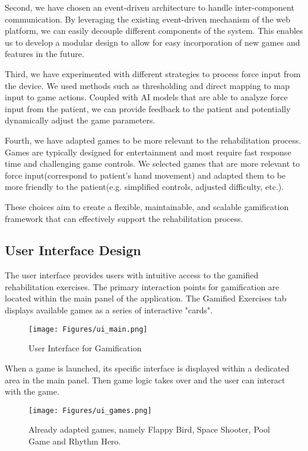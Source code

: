 Second, we have chosen an event-driven architecture to handle inter-component communication.
By leveraging the existing event-driven mechanism of the web platform, we can easily decouple different components of the system.
This enables us to develop a modular design to allow for easy incorporation of new games and features in the future.

Third, we have experimented with different strategies to process force input from the device.
We used methods such as thresholding and direct mapping to map input to game actions.
Coupled with AI models that are able to analyze force input from the patient, 
we can provide feedback to the patient and potentially dynamically adjust the game parameters.

Fourth, we have adapted games to be more relevant to the rehabilitation process. 
Games are typically designed for entertainment and most require fast response time and challenging game controls. 
We selected games that are more relevant to force input(correspond to patient's hand movement) 
and adapted them to be more friendly to the patient(e.g. simplified controls, adjusted difficulty, etc.).

These choices aim to create a flexible, maintainable, and scalable gamification framework that can effectively support the rehabilitation process.


\subsection{User Interface Design}
The user interface provides users with intuitive access to the gamified rehabilitation exercises. 
The primary interaction points for gamification are located within the main panel of the application. 
The Gamified Exercises tab displays available games as a series of interactive "cards". 
\begin{figure} [h!]
    \centering
    \texttt{[image: Figures/ui\_main.png]}
    \caption{User Interface for Gamification}
    \label{fig:ui_main}
\end{figure}

When a game is launched, its specific interface is displayed within a dedicated area in the main panel. 
Then game logic takes over and the user can interact with the game. 
\begin{figure} [h!]
    \centering
    \texttt{[image: Figures/ui\_games.png]}
    \caption{Already adapted games, namely Flappy Bird, Space Shooter, Pool Game and Rhythm Hero.}
    \label{fig:ui_games}
\end{figure}

